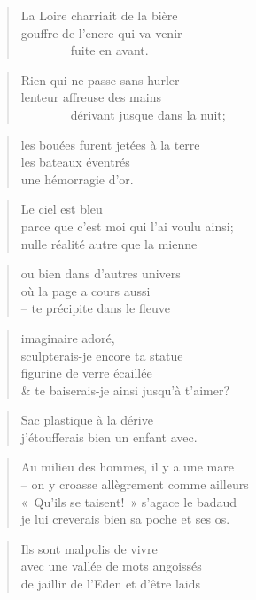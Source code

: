   \begin{verse}
    La Loire charriait de la bière\\
    gouffre de l’encre qui va venir\\
    ~~~~~~~~fuite en avant.
  \end{verse}
  \begin{verse}
    Rien qui ne passe sans hurler\\
    lenteur affreuse des mains\\
    ~~~~~~~~dérivant jusque dans la nuit;
  \end{verse}
  \begin{verse}
    les bouées furent jetées à la terre\\
    les bateaux éventrés\\
    une hémorragie d’or.
  \end{verse}
  \begin{verse}
    Le ciel est bleu\\
    parce que c’est moi qui l’ai voulu ainsi;\\
    nulle réalité autre que la mienne
  \end{verse}
  \begin{verse}
    ou bien dans d’autres univers\\
    où la page a cours aussi\\
    -- te précipite dans le fleuve
  \end{verse}
  \begin{verse}
    imaginaire adoré,\\
    sculpterais-je encore ta statue\\
    figurine de verre écaillée\\
    \& te baiserais-je ainsi jusqu’à t’aimer?
  \end{verse}
  \begin{verse}
    Sac plastique à la dérive\\
    j’étoufferais bien un enfant avec.
  \end{verse}
  \begin{verse}
    Au milieu des hommes, il y a une mare\\
    -- on y croasse allègrement comme ailleurs\\
    «~Qu’ils se taisent!~» s’agace le badaud\\
    je lui creverais bien sa poche et ses os.
\end{verse}
  \begin{verse}
    Ils sont malpolis de vivre\\
    avec une vallée de mots angoissés\\
    de jaillir de l’Eden et d’être laids
  \end{verse}
